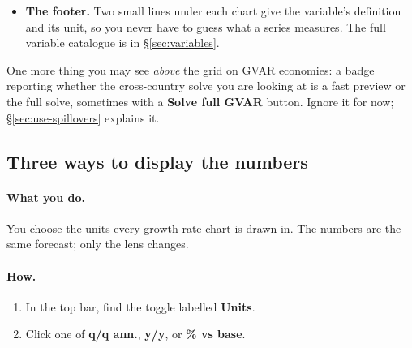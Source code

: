 \documentclass[11pt]{article}
\theoremstyle{definition}
\theoremstyle{remark}
\begin{document}
\begin{itemize}
    turns into \textbf{CONDITIONED} and gives the panel a blue border once active. Charts
    computed from other charts by an accounting identity --- the change in debt-to-GDP
    ($\Delta$~Debt-to-GDP) or the external-sector charts, for example --- show a
    \textbf{derived} badge instead and cannot be steered directly. If you have moved a
    variable's long-run target off the model's estimate, its title turns amber and shows a
    small \textbf{judgement} badge with a pencil mark (\S\ref{sec:use-longrun}). While a chart
    is steerable, a hint badge appears top-right: \textbf{drag to set path} --- or, on the
    policy-rate chart, \textbf{drag to adjust policy}.
  \item \textbf{The footer.} Two small lines under each chart give the variable's definition
    and its unit, so you never have to guess what a series measures. The full variable
    catalogue is in \S\ref{sec:variables}.
\end{itemize}

One more thing you may see \emph{above} the grid on GVAR economies: a badge reporting whether
the cross-country solve you are looking at is a fast preview or the full solve, sometimes with a
\textbf{Solve full GVAR} button. Ignore it for now; \S\ref{sec:use-spillovers} explains it.

\subsection{Three ways to display the numbers}

\paragraph{What you do.} You choose the units every growth-rate chart is drawn in. The numbers
are the same forecast; only the lens changes.

\paragraph{How.}
\begin{enumerate}
  \item In the top bar, find the toggle labelled \textbf{Units}.
  \item Click one of \textbf{q/q ann.}, \textbf{y/y}, or \textbf{\% vs base}.
\end{enumerate}
\end{document}
